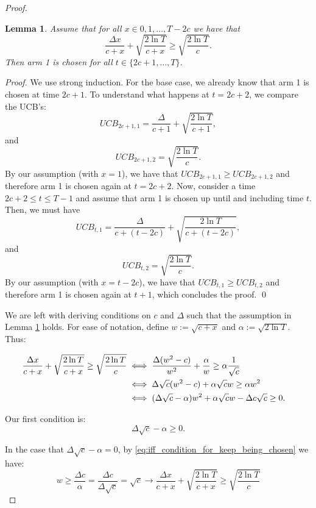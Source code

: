 \documentclass[opre,nonblindrev]{informs3} %
\newtheorem{lemma}{Lemma}
\begin{document}
\begin{proof}
\begin{lemma}\label{lem:arm_1_keeps_being_chosen}
    Assume that for all $x\in{0,1,\ldots,T-2c}$ we have that
    $$\frac{\Delta x}{c+x}+\sqrt{\frac{2\ln{T}}{c+x}}\geq \sqrt{\frac{2\ln{T}}{c}}.$$
    Then arm 1 is chosen for all $t\in\{2c+1,\ldots,T\}$.
\end{lemma}
\begin{proof}
    We use strong induction. For the base case, we already know that arm 1 is chosen at time $2c+1$. To understand what happens at $t=2c+2$, we compare the UCB's:
    $$UCB_{2c+1,1}=\frac{\Delta }{c+1}+\sqrt{\frac{2\ln{T}}{c+1}},$$
    and
    $$UCB_{2c+1,2}=\sqrt{\frac{2\ln{T}}{c}}.$$
    By our assumption (with $x=1$), we have that $UCB_{2c+1,1}\geq UCB_{2c+1,2}$ and therefore arm 1 is chosen again at $t=2c+2$. Now, consider a time $2c+2\leq t \leq T-1$ and assume that arm 1 is chosen up until and including time $t$. Then, we must have 
    $$UCB_{t,1}=\frac{\Delta }{c+(t-2c)}+\sqrt{\frac{2\ln{T}}{c+(t-2c)}},$$
    and
    $$UCB_{t,2}=\sqrt{\frac{2\ln{T}}{c}}.$$
    By our assumption (with $x=t-2c$), we have that $UCB_{t,1}\geq UCB_{t,2}$ and therefore arm 1 is chosen again at $t+1$, which concludes the proof. \qed
\end{proof}

    We are left with deriving conditions on $c$ and $\Delta$ such that the assumption in Lemma \ref{lem:arm_1_keeps_being_chosen} holds. For ease of notation, define $w:=\sqrt{c+x}$ and $\alpha:=\sqrt{2\ln{T}}$. Thus: 

    \begin{align}
        \frac{\Delta x}{c+x}+\sqrt{\frac{2\ln{T}}{c+x}}\geq \sqrt{\frac{2\ln{T}}{c}} &\iff \frac{\Delta (w^2-c)}{w^2}+\frac{\alpha}{w}\geq \alpha\frac{1}{\sqrt{c}}\cr
        &\iff 
        \Delta \sqrt{c}(w^2-c)+\alpha\sqrt{c} w\geq \alpha w^2\cr
        &\iff (\Delta \sqrt{c}-\alpha)w^2+\alpha\sqrt{c} w-\Delta c \sqrt{c} \geq 0.
        \label{eq:iff_condition_for_keep_being_chosen}
    \end{align}

    Our first condition is:
    \begin{equation}
        \Delta \sqrt{c}-\alpha \geq 0.
        \label{eq:condition_on_instance}
    \end{equation}

    In the case that $\Delta\sqrt{c}-\alpha=0$, by \ref{eq:iff_condition_for_keep_being_chosen} we have:
    \begin{equation}
        w \geq \frac{\Delta c}{\alpha} = \frac{\Delta c}{\Delta \sqrt{c}}  = \sqrt{c} \rightarrow \frac{\Delta x}{c+x}+\sqrt{\frac{2\ln{T}}{c+x}}\geq \sqrt{\frac{2\ln{T}}{c}} \label{eq:if_non_strict_inequality}
    \end{equation}


\end{proof}
\end{document}

